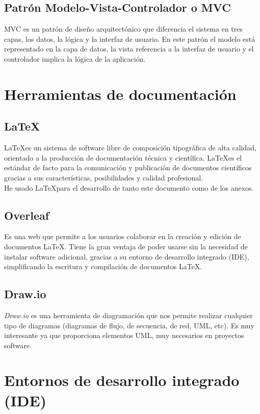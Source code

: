 \subsection{Patrón Modelo-Vista-Controlador o MVC}

MVC es un patrón de diseño arquitectónico que diferencia el sistema en tres capas, los datos, la lógica y la interfaz de usuario. En este patrón el modelo está representado en la capa de datos, la vista referencia a la interfaz de usuario y el controlador implica la lógica de la aplicación.

\section{Herramientas de documentación}

\subsection{\LaTeX}

\LaTeX es un sistema de software libre de composición tipográfica de alta calidad, orientado a la producción de documentación técnica y científica. \LaTeX es el estándar de facto para la comunicación y publicación de documentos científicos gracias a sus características, posibilidades y calidad profesional.\\
He usado \LaTeX para el desarrollo de tanto este documento como de los anexos.

\subsection{Overleaf}
Es una web que permite a los usuarios colaborar en la creación y edición de documentos LaTeX. Tiene la gran ventaja de poder usarse sin la necesidad de instalar software adicional, gracias a su entorno de desarrollo integrado (IDE), simplificando la escritura y compilación de documentos LaTeX.

\subsection{Draw.io}

\textit{Draw.io} es una herramienta de diagramación que nos permite realizar cualquier tipo de diagramas (diagramas de flujo, de secuencia, de red, UML, etc). Es muy interesante ya que proporciona elementos UML, muy necesarios en proyectos software.

\section{Entornos de desarrollo integrado (IDE)}

